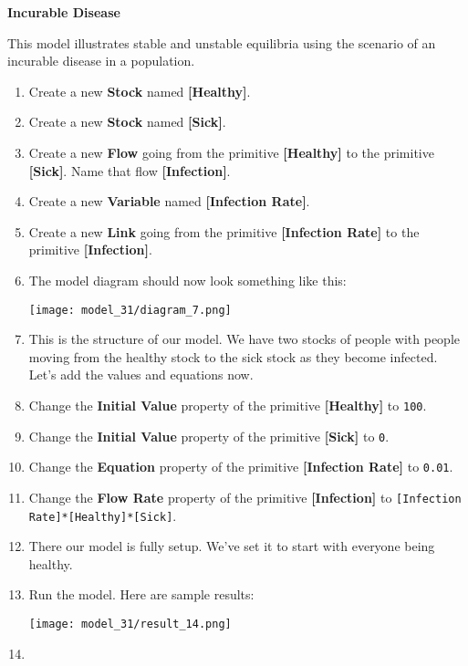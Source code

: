 \documentclass[]{memoir}
\makeatletter
\def\maxwidth{\ifdim\Gin@nat@width>\linewidth\linewidth
\else\Gin@nat@width\fi}
\let\Oldincludegraphics\includegraphics
\renewcommand{\includegraphics}[1]{\Oldincludegraphics[width=\maxwidth]{#1}}
\newcommand{\p}[1]{\textbf{{[}#1{]}}}
\newcommand{\e}[1]{\texttt{#1}}
\renewcommand{\a}[1]{\textbf{#1}}
\makeatother
\begin{document}
\begin{oframed}\textbf{Incurable Disease} 

 This model illustrates stable and unstable equilibria using the scenario of an incurable disease in a population.

\begin{enumerate}
\item Create a new \a{Stock} named \p{Healthy}.
\item Create a new \a{Stock} named \p{Sick}.
\item Create a new \a{Flow} going from the primitive \p{Healthy} to the primitive \p{Sick}. Name that flow \p{Infection}.
\item Create a new \a{Variable} named \p{Infection Rate}.
\item Create a new \a{Link} going from the primitive \p{Infection Rate} to the primitive \p{Infection}.
\item The model diagram should now look something like this: \par \begin{minipage}{\linewidth}  \centering \texttt{[image: model\_31/diagram\_7.png]}
\end{minipage}
\item 

This is the structure of our model. We have two stocks of people with people moving from the healthy stock to the sick stock as they become infected. Let's add the values and equations now.


\item  Change the \a{Initial Value} property of the primitive \p{Healthy} to \e{100}.
\item  Change the \a{Initial Value} property of the primitive \p{Sick} to \e{0}.
\item  Change the \a{Equation} property of the primitive \p{Infection Rate} to \e{0.01}.
\item  Change the \a{Flow Rate} property of the primitive \p{Infection} to \e{[Infection Rate]*[Healthy]*[Sick]}.
\item 

There our model is fully setup. We've set it to start with everyone being healthy.


\item Run the model. Here are sample results:\par \begin{minipage}{\linewidth}  \centering \texttt{[image: model\_31/result\_14.png]}
\end{minipage}
\item 


\end{enumerate}
\end{oframed}
\end{document}
